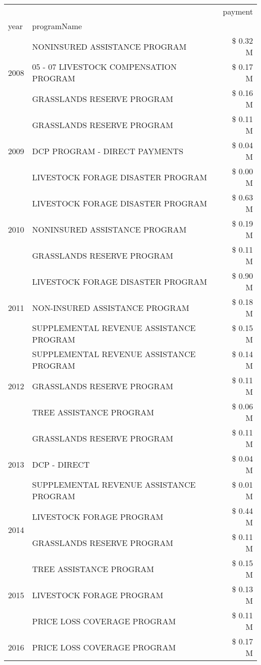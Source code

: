 \begin{tabular}{llr}
\toprule
 &  & payment \\
year & programName &  \\
\midrule
\multirow[t]{3}{*}{2008} & NONINSURED ASSISTANCE PROGRAM & \$ 0.32 M \\
 & 05 - 07 LIVESTOCK COMPENSATION PROGRAM & \$ 0.17 M \\
 & GRASSLANDS RESERVE PROGRAM & \$ 0.16 M \\
\cline{1-3}
\multirow[t]{3}{*}{2009} & GRASSLANDS RESERVE PROGRAM & \$ 0.11 M \\
 & DCP PROGRAM - DIRECT PAYMENTS & \$ 0.04 M \\
 & LIVESTOCK FORAGE DISASTER  PROGRAM & \$ 0.00 M \\
\cline{1-3}
\multirow[t]{3}{*}{2010} & LIVESTOCK FORAGE DISASTER  PROGRAM & \$ 0.63 M \\
 & NONINSURED ASSISTANCE PROGRAM & \$ 0.19 M \\
 & GRASSLANDS RESERVE PROGRAM & \$ 0.11 M \\
\cline{1-3}
\multirow[t]{3}{*}{2011} & LIVESTOCK FORAGE DISASTER PROGRAM & \$ 0.90 M \\
 & NON-INSURED ASSISTANCE PROGRAM & \$ 0.18 M \\
 & SUPPLEMENTAL REVENUE ASSISTANCE PROGRAM & \$ 0.15 M \\
\cline{1-3}
\multirow[t]{3}{*}{2012} & SUPPLEMENTAL REVENUE ASSISTANCE PROGRAM & \$ 0.14 M \\
 & GRASSLANDS RESERVE PROGRAM & \$ 0.11 M \\
 & TREE ASSISTANCE PROGRAM & \$ 0.06 M \\
\cline{1-3}
\multirow[t]{3}{*}{2013} & GRASSLANDS RESERVE PROGRAM & \$ 0.11 M \\
 & DCP - DIRECT & \$ 0.04 M \\
 & SUPPLEMENTAL REVENUE ASSISTANCE PROGRAM & \$ 0.01 M \\
\cline{1-3}
\multirow[t]{2}{*}{2014} & LIVESTOCK FORAGE PROGRAM & \$ 0.44 M \\
 & GRASSLANDS RESERVE PROGRAM & \$ 0.11 M \\
\cline{1-3}
\multirow[t]{3}{*}{2015} & TREE ASSISTANCE PROGRAM & \$ 0.15 M \\
 & LIVESTOCK FORAGE PROGRAM & \$ 0.13 M \\
 & PRICE LOSS COVERAGE PROGRAM & \$ 0.11 M \\
\cline{1-3}
\multirow[t]{3}{*}{2016} & PRICE LOSS COVERAGE PROGRAM                   & \$ 0.17 M \\

\end{tabular}
